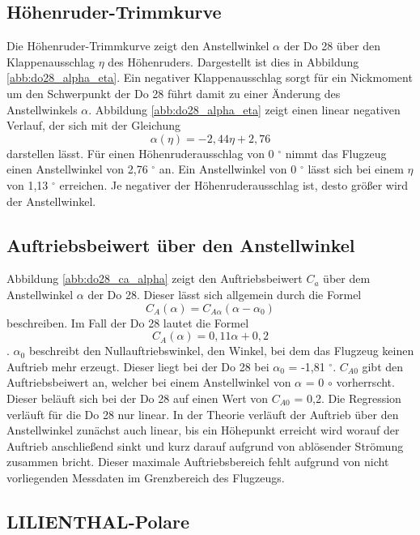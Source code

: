 \subsection{Höhenruder-Trimmkurve}
Die Höhenruder-Trimmkurve zeigt den Anstellwinkel $\alpha$ der Do 28 über den Klappenausschlag $\eta$ des Höhenruders. Dargestellt ist dies in Abbildung \ref{abb:do28_alpha_eta}. Ein negativer Klappenausschlag sorgt für ein Nickmoment um den Schwerpunkt der Do 28 führt damit zu einer Änderung des Anstellwinkels $\alpha$. Abbildung \ref{abb:do28_alpha_eta} zeigt einen linear negativen Verlauf, der sich mit der Gleichung
\begin{equation}
\alpha(\eta) = -2,44\eta + 2,76
\end{equation}
darstellen lässt. Für einen Höhenruderausschlag von 0 $^\circ$ nimmt das Flugzeug einen Anstellwinkel von 2,76 $^\circ$ an. Ein Anstellwinkel von 0 $^\circ$ lässt sich bei einem $\eta$ von 1,13 $^\circ$ erreichen. Je negativer der Höhenruderausschlag ist, desto größer wird der Anstellwinkel.
  
\subsection{Auftriebsbeiwert über den Anstellwinkel}
Abbildung \ref{abb:do28_ca_alpha} zeigt den Auftriebsbeiwert $C_a$ über dem Anstellwinkel $\alpha$ der Do 28. Dieser lässt sich allgemein durch die Formel
\begin{equation}  \label{eq:theorie_ca}
C_A(\alpha) = C_{A\alpha}(\alpha - \alpha_0)
\end{equation}
beschreiben. Im Fall der Do 28 lautet die Formel
\begin{equation}  \label{eq:versuch_ca}
C_A(\alpha) = 0,11\alpha + 0,2
\end{equation}.
$\alpha_{0}$ beschreibt den Nullauftriebswinkel, den Winkel, bei dem das Flugzeug keinen Auftrieb mehr erzeugt. Dieser liegt bei der Do 28 bei $\alpha_{0}$ = -1,81 $^\circ$. $C_{A0}$ gibt den Auftriebsbeiwert an, welcher bei einem Anstellwinkel von $\alpha$ = 0 $\circ$ vorherrscht. Dieser beläuft sich bei der Do 28 auf einen Wert von $C_{A0}$ = 0,2. Die Regression verläuft für die Do 28 nur linear. In der Theorie verläuft der Auftrieb über den Anstellwinkel zunächst auch linear, bis ein Höhepunkt erreicht wird worauf der Auftrieb anschließend sinkt und kurz darauf aufgrund von ablösender Strömung zusammen bricht.  
Dieser maximale Auftriebsbereich fehlt aufgrund von nicht vorliegenden Messdaten im Grenzbereich des Flugzeugs. 
\subsection{LILIENTHAL-Polare}
